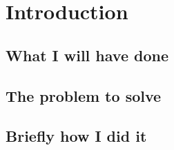 \chapter{Introduction}
  \section{What I will have done}
  
  \section{The problem to solve}
  
  \section{Briefly how I did it}
